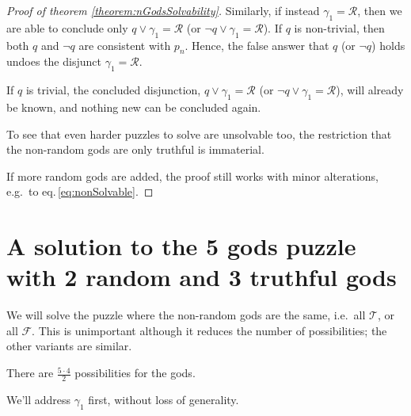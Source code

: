\documentclass[twoside,twocolumn,a4paper,11pt]{article}
\theoremstyle{definition}
\begin{document}
\begin{proof}[Proof of theorem \ref{theorem:nGodsSolvability}]
Similarly, if instead $\gamma_1=\mathcal{R}$, then we are able to conclude only
$q \vee \gamma_1\!=\!\mathcal{R}$ (or $\neg q \vee \gamma_1\!=\!\mathcal{R}$).
If $q$ is non-trivial, 
then both $q$ and $\neg q$ are consistent with $p_n$.
Hence, the false answer that $q$ (or $\neg q$) holds
undoes the disjunct $\gamma_1=\mathcal{R}$. 

If $q$ is trivial, the concluded disjunction, 
$q \vee \gamma_1\!=\!\mathcal{R}$ (or $\neg q \vee \gamma_1\!=\!\mathcal{R}$),
will already be known, and nothing new can be concluded again.


To see that even harder puzzles to solve are unsolvable too,
the restriction that the non-random gods are only truthful is immaterial.

If more random gods are added, the proof still works with minor alterations, e.g.\
to eq.\,\eqref{eq:nonSolvable}. 
\end{proof}


\section{A solution to the 5 gods puzzle with 2 random and 3 truthful gods}
\label{sec:t3r2}

We will solve the puzzle where the non-random gods are the same,
i.e.\ all $\mathcal{T}$, or all $\mathcal{F}$. 
This is unimportant
although it reduces the number of possibilities; 
the other variants are similar.

There are $\frac{5\cdot 4}{2}$ possibilities for the gods.

We'll address $\gamma_1$ first, without loss of generality.
\end{document}
